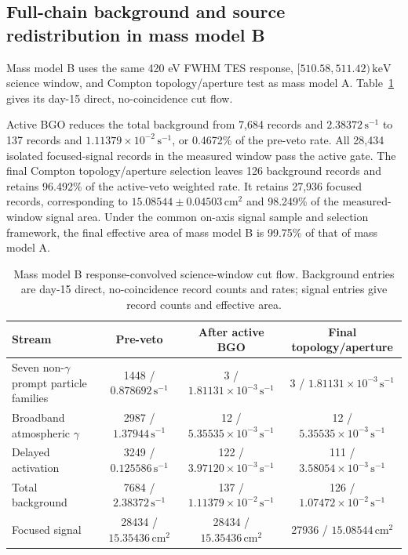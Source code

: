 \documentclass[11pt]{article}
\newcommand{\revblue}[1]{\textcolor{revisionblue}{#1}}
\newcommand{\keV}{\ensuremath{\,\mathrm{keV}}}
\newcommand{\cps}{\ensuremath{\,\mathrm{s^{-1}}}}
\begin{document}
\FloatBarrier

\subsection{Full-chain background and source redistribution in mass model B}
\label{subsec:optimized_fullchain}

Mass model B uses the same 420 eV FWHM TES response, $[510.58,511.42)\keV$ science window, and Compton topology/aperture test as mass model A. Table~\ref{tab:optimized_cutflow} gives its day-15 direct, no-coincidence cut flow.

Active BGO reduces the total background from 7,684 records and $2.38372\cps$ to 137 records and $1.11379\times10^{-2}\cps$, or 0.4672\% of the pre-veto rate. All 28,434 isolated focused-signal records in the measured window pass the active gate. The final Compton topology/aperture selection leaves 126 background records and retains 96.492\% of the active-veto weighted rate. It retains 27,936 focused records, corresponding to $15.08544\pm0.04503\,\mathrm{cm^2}$ and 98.249\% of the measured-window signal area. \revblue{Under the common on-axis signal sample and selection framework, the final effective area of mass model B is 99.75\% of that of mass model A.}

\begin{table}[H]
\centering
\caption{Mass model B response-convolved science-window cut flow. Background entries are day-15 direct, no-coincidence record counts and rates; signal entries give record counts and effective area.}
\label{tab:optimized_cutflow}
\footnotesize
\begin{tabular}{lccc}
\toprule
Stream & Pre-veto & After active BGO & Final topology/aperture \\
\midrule
\revblue{Seven non-$\gamma$ prompt particle families} & 1448 / $0.878692\cps$ & 3 / $1.81131\times10^{-3}\cps$ & 3 / $1.81131\times10^{-3}\cps$ \\
Broadband atmospheric $\gamma$ & 2987 / $1.37944\cps$ & 12 / $5.35535\times10^{-3}\cps$ & 12 / $5.35535\times10^{-3}\cps$ \\
Delayed activation & 3249 / $0.125586\cps$ & 122 / $3.97120\times10^{-3}\cps$ & 111 / $3.58054\times10^{-3}\cps$ \\
Total background & 7684 / $2.38372\cps$ & 137 / $1.11379\times10^{-2}\cps$ & 126 / $1.07472\times10^{-2}\cps$ \\
Focused signal & 28434 / $15.35436\,\mathrm{cm^2}$ & 28434 / $15.35436\,\mathrm{cm^2}$ & 27936 / $15.08544\,\mathrm{cm^2}$ \\
\bottomrule
\end{tabular}
\end{table}
\end{document}
